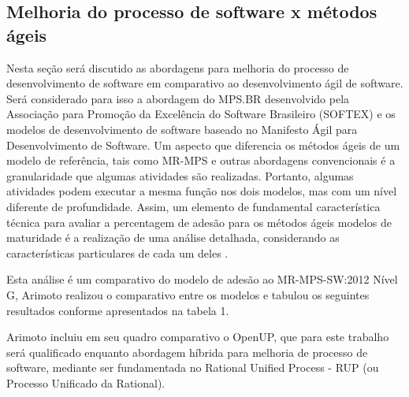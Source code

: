 \documentclass{acm_proc_article-sp}
\begin{document}
\subsection{Melhoria do processo de software x métodos ágeis}
Nesta seção será discutido as abordagens para melhoria do processo de desenvolvimento de software em comparativo ao desenvolvimento ágil de software. Será considerado para isso a abordagem do MPS.BR desenvolvido pela Associação para Promoção da Excelência do Software Brasileiro (SOFTEX) e os modelos de desenvolvimento de software baseado no Manifesto Ágil para Desenvolvimento de Software. Um aspecto que diferencia os métodos ágeis de um modelo de referência, tais como MR-MPS e
outras abordagens convencionais é a granularidade que algumas atividades são realizadas. Portanto, algumas atividades podem executar a mesma função nos dois modelos, mas com um nível diferente de profundidade. Assim, um elemento de fundamental
característica técnica para avaliar a percentagem de adesão para os métodos ágeis modelos de maturidade é a realização de uma análise detalhada, considerando as características particulares de cada um deles \cite{Arimoto:melhoria}.  

Esta análise é um comparativo do modelo de adesão ao MR-MPS-SW:2012 Nível G, Arimoto \cite{Arimoto:melhoria} realizou o comparativo entre os modelos e tabulou os seguintes resultados conforme apresentados na tabela 1.

Arimoto \cite{Arimoto:melhoria} incluiu em seu quadro comparativo o OpenUP, que para este trabalho será qualificado enquanto abordagem híbrida para melhoria de processo de software, mediante ser fundamentada no Rational Unified Process - RUP (ou Processo Unificado da Rational).
\end{document}
